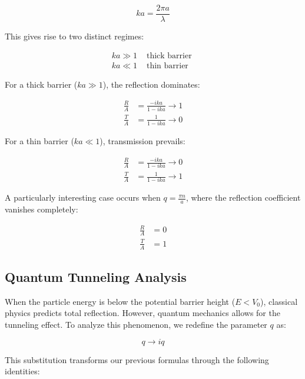 \documentclass[italian]{HKNdocument}
\begin{document}
\begin{equation}
k a=\frac{2 \pi a}{\lambda} \label{eq:6.68}
\end{equation}

This gives rise to two distinct regimes:

\[
\begin{array}{ll}
k a \gg 1 & \text { thick barrier } \\
k a \ll 1 & \text { thin barrier } \label{eq:6.69}
\end{array}
\]

For a thick barrier ($ka \gg 1$), the reflection dominates:

\begin{align}
\frac{R}{A} & =\frac{-i k a}{1-i k a} \rightarrow 1 \\
\frac{T}{A} & =\frac{1}{1-i k a} \rightarrow 0 \label{eq:6.70}
\end{align}

For a thin barrier ($ka \ll 1$), transmission prevails:

\begin{align}
\frac{R}{A} & =\frac{-i k a}{1-i k a} \rightarrow 0 \\
\frac{T}{A} & =\frac{1}{1-i k a} \rightarrow 1 \label{eq:6.71}
\end{align}

A particularly interesting case occurs when $q=\frac{\pi n}{a}$, where the reflection coefficient vanishes completely:

\begin{align}
\frac{R}{A} & =0 \\
\frac{T}{A} & =1 \label{eq:6.72}
\end{align}


\subsection{Quantum Tunneling Analysis}

When the particle energy is below the potential barrier height ($E < V_0$), classical physics predicts total reflection. However, quantum mechanics allows for the tunneling effect. To analyze this phenomenon, we redefine the parameter $q$ as:

\begin{equation}
q \rightarrow i q \label{eq:6.73}
\end{equation}

This substitution transforms our previous formulas through the following identities:
\end{document}

